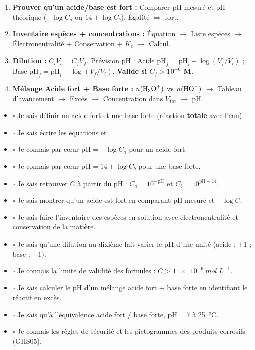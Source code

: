 \documentclass[11pt]{article}
\begin{document}
\begin{methode}
\begin{enumerate}
  \item \textbf{Prouver qu'un acide/base est fort :} Comparer pH mesuré et pH théorique ($-\log C_a$ ou $14+\log C_b$). Égalité $\Rightarrow$ fort.
  \item \textbf{Inventaire espèces + concentrations :} Équation $\to$ Liste espèces $\to$ Électroneutralité + Conservation + $K_e$ $\to$ Calcul.
  \item \textbf{Dilution :} $C_i V_i = C_f V_f$. Prévision pH : Acide $\mathrm{pH}_f = \mathrm{pH}_i + \log(V_f/V_i)$ ; Base $\mathrm{pH}_f = \mathrm{pH}_i - \log(V_f/V_i)$. \textbf{Valide si $C_f > 10^{-6}$ M.}
  \item \textbf{Mélange Acide fort + Base forte :} $n(\ce{H3O+})$ vs $n(\ce{HO-})$ $\to$ Tableau d'avancement $\to$ Excès $\to$ Concentration dans $V_{\text{tot}}$ $\to$ pH.
\end{enumerate}
\end{methode}

\begin{aretenir}
\begin{itemize}
  \item $\square$ Je sais définir un acide fort et une base forte (réaction \textbf{totale} avec l'eau).
  \item $\square$ Je sais écrire les équations  et .
  \item $\square$ Je connais par cœur $\mathrm{pH} = -\log C_a$ pour un acide fort.
  \item $\square$ Je connais par cœur $\mathrm{pH} = 14 + \log C_b$ pour une base forte.
  \item $\square$ Je sais retrouver $C$ à partir du pH : $C_a = 10^{-\mathrm{pH}}$ et $C_b = 10^{\mathrm{pH}-14}$.
  \item $\square$ Je sais montrer qu'un acide est fort en comparant pH mesuré et $-\log C$.
  \item $\square$ Je sais faire l'inventaire des espèces en solution avec électroneutralité et conservation de la matière.
  \item $\square$ Je sais qu'une dilution au dixième fait varier le pH d'une unité (acide : $+1$ ; base : $-1$).
  \item $\square$ Je connais la limite de validité des formules : $C > \SI{1e-6}{mol.L^{-1}}$.
  \item $\square$ Je sais calculer le pH d'un mélange acide fort + base forte en identifiant le réactif en excès.
  \item $\square$ Je sais qu'à l'équivalence acide fort / base forte, $\mathrm{pH} = 7$ à \SI{25}{\celsius}.
  \item $\square$ Je connais les règles de sécurité et les pictogrammes des produits corrosifs (GHS05).
\end{itemize}
\end{aretenir}
\end{document}
